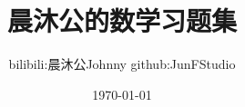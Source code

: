 \documentclass{plainbook}
\title{晨沐公的数学习题集}
\author{bilibili:晨沐公Johnny \quad github:JunFStudio}
\date{\today}
\begin{document}
\frontmatter



\maketitle\pagebreak

% 





% 

% 

\tableofcontents

\mainmatter








% 

% 

% 

% 

% 

% 

% 

\end{document}
